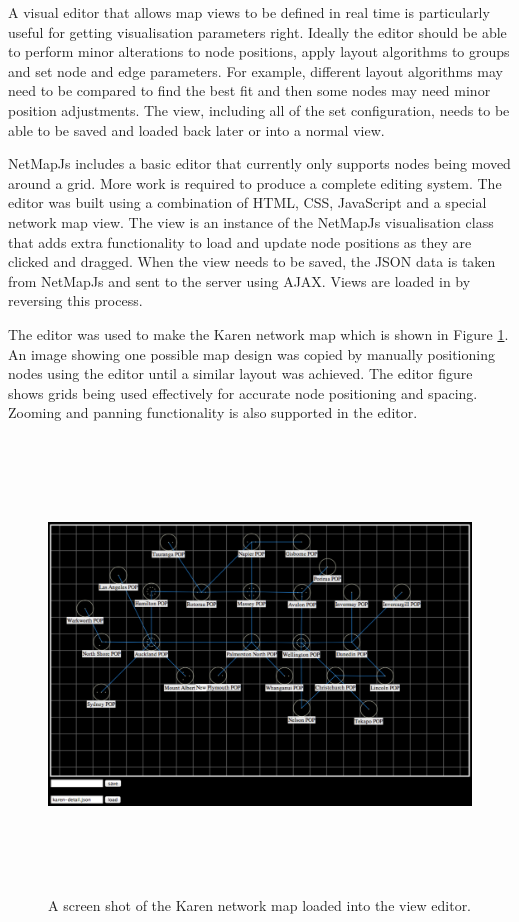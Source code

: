 \documentclass[11pt, a4paper]{article}
\begin{document}
A visual editor that allows map views to be defined in real time is particularly
useful for getting visualisation parameters right. Ideally the editor should be
able to perform minor alterations to node positions, apply layout algorithms to
groups and set node and edge parameters. For example, different layout
algorithms may need to be compared to find the best fit and then some nodes may
need minor position adjustments. The view, including all of the set
configuration, needs to be able to be saved and loaded back later or into a
normal view.

NetMapJs includes a basic editor that currently only supports nodes being moved
around a grid. More work is required to produce a complete editing system. The
editor was built using a combination of HTML, CSS, JavaScript and a special
network map view. The view is an instance of the NetMapJs visualisation class
that adds extra functionality to load and update node positions as they are
clicked and dragged. When the view needs to be saved, the JSON data is taken
from NetMapJs and sent to the server using AJAX. Views are loaded in by
reversing this process.

The editor was used to make the Karen network map which is shown in Figure
\ref{fig:editor1.0}. An image showing one possible map design was copied by
manually positioning nodes using the editor until a similar layout was achieved.
The editor figure shows grids being used effectively for accurate node
positioning and spacing. Zooming and panning functionality is also supported in
the editor.

\begin{figure}
\centering
\includegraphics[width=170mm,height=120.16mm]{assets/editor1-0.pdf}
\caption{A screen shot of the Karen network map loaded into the view editor.}
\label{fig:editor1.0}
\end{figure}
\end{document}
